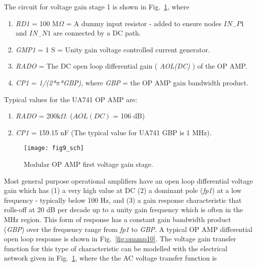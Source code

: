 The circuit for voltage gain stage 1 is shown in Fig.~\ref{fig:opamp9}, where
\begin{enumerate}
\item\textit{ RD1} = 100 M$\Omega$ = A dummy input resistor - added to ensure nodes $IN_{-}P1$ and $IN_{-}N1$ are connected by a DC path.
\item \textit{GMP1} = 1 S = Unity gain voltage controlled current generator.
\item \textit{RADO }= The DC open loop differential gain ( \textit{AOL(DC)} ) of the OP AMP.
\item \textit{CP1}  = \textit{1/(2*$\pi$*GBP)}, where \textit{GBP} = the OP AMP gain bandwidth product.
\end{enumerate}

Typical values for the UA741 OP AMP are:
\begin{enumerate}
\item \textit{RADO} =  200k$\Omega$. ($AOL(DC)$ = 106 dB)
\item \textit{CP1}  =  159.15 nF  (The typical value for UA741 GBP is 1 MHz).
\end{enumerate}



\FloatBarrier
\begin{figure}
  \centering
  \texttt{[image: fig9\_sch]}
  \caption{Modular OP AMP first voltage gain stage.}
  \label{fig:opamp9}
\end{figure}




Most general purpose operational amplifiers have an open loop differential voltage gain which has (1) a very high value at DC (2) a dominant pole (\textit{fp1}) at a low frequency - typically below 100 Hz, and (3) a gain response characteristic that rolls-off at 20 dB per decade up to a unity gain frequency which is often in the MHz region.  This form of response has a constant gain bandwidth product (\textit{GBP}) over the frequency range from \textit{fp1} to \textit{GBP}.  A typical OP AMP differential open loop response is shown in Fig.~\ref{fig:opamp10}. The voltage gain transfer function for this type of characteristic can be modelled with the electrical network given in Fig.~\ref{fig:opamp9}, where the the AC voltage transfer function is



